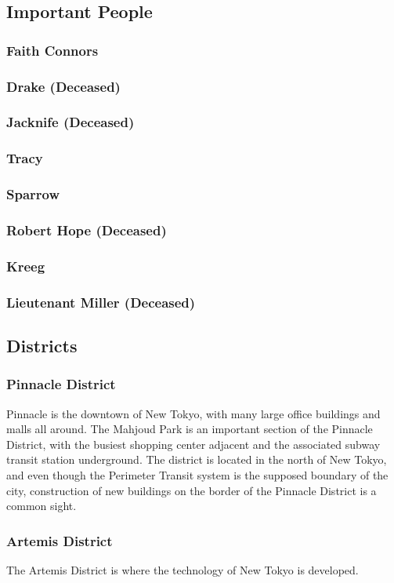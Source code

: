 \documentclass{article}
\begin{document}
\subsection{Important People}
\subsubsection{Faith Connors}
\subsubsection{Drake (Deceased)}
\subsubsection{Jacknife (Deceased)}
\subsubsection{Tracy}
\subsubsection{Sparrow}
\subsubsection{Robert Hope (Deceased)}
\subsubsection{Kreeg}
\subsubsection{Lieutenant Miller (Deceased)}
\subsection{Districts}
\subsubsection{Pinnacle District}
Pinnacle is the downtown of New Tokyo, with many large office buildings and
malls all around. The Mahjoud Park is an important section of the Pinnacle
District, with the busiest shopping center adjacent and the associated subway
transit station underground. The district is located in the north of New Tokyo,
and even though the Perimeter Transit system is the supposed boundary of the
city, construction of new buildings on the border of the Pinnacle District is a
common sight.
\subsubsection{Artemis District}
The Artemis District is where the technology of New Tokyo is developed.
\end{document}
